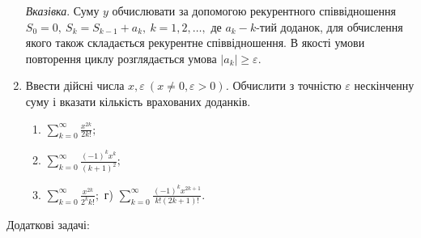\documentclass[]{article}
\makeatletter
\newcommand{\xslalph}[1]{\expandafter\@xslalph\csname c@#1\endcsname}
\newcommand{\@xslalph}[1]{%
    \ifcase#1\or а\or б\or в\or г\or д\or e\or є\or ж\or з\or i%
    \or й\or к\or л\or м\or н\or о\or п\or р\or с\or т%
    \or у\or ф\or х\or ц\or ч\or ш\or ю\or я\or аа\or бб\or вв%
    \else\@ctrerr\fi%
}
\makeatother
\begin{document}
\begin{enumerate}
\begin{enumerate}[label=\xslalph*)]
\end{enumerate}

\emph{\emph{Вказівка}}. Суму $y$ обчислювати за допомогою
рекурентного співвідношення
\(S_{0} = 0,\ S_{k} = S_{k - 1} + a_{k},\ k = 1,2,\ldots,\) де
\(a_{k} - k\)-тий доданок, для обчислення якого також складається
рекурентне співвідношення. В якості умови повторення циклу розглядається
умова \(\left| a_{k} \right| \geq \varepsilon.\)

\item
  Ввести дійсні числа
  \(x,\varepsilon\ (x \neq 0,\varepsilon > 0)\)\emph{.} Обчислити з
  точністю \(\varepsilon\) нескінченну суму і вказати кількість
  врахованих доданків.
\begin{enumerate}[label=\xslalph*)]
\item \(\sum_{k = 0}^{\infty}\frac{x^{2k}}{2k!};\) 
\item \(\sum_{k = 0}^{\infty}\frac{( - 1)^{k}x^{k}}{(k + 1)^{2}};\)
\item \(\sum_{k = 0}^{\infty}\frac{x^{2k}}{2^{k}k!};\) г)
\(\sum_{k = 0}^{\infty}\frac{( - 1)^{k}x^{2k + 1}}{k!(2k + 1)!}.\)
\end{enumerate}

\end{enumerate}

Додаткові задачі:
\end{document}
